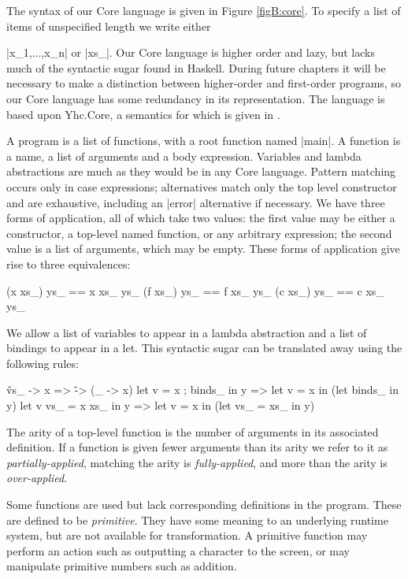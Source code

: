 The syntax of our Core language is given in Figure \ref{figB:core}. To specify a list of items of unspecified length we write either \ignore|x_1,...,x_n| or |xs_|. Our Core language is higher order and lazy, but lacks much of the syntactic sugar found in Haskell. During future chapters it will be necessary to make a distinction between higher-order and first-order programs, so our Core language has some redundancy in its representation. The language is based upon Yhc.Core, a semantics for which is given in \cite{me:yhc_core}.

A program is a list of functions, with a root function named |main|. A function is a name, a list of arguments and a body expression. Variables and lambda abstractions are much as they would be in any Core language.  Pattern matching occurs only in case expressions; alternatives match only the top level constructor and are exhaustive, including an |error| alternative if necessary. We have three forms of application, all of which take two values: the first value may be either a constructor, a top-level named function, or any arbitrary expression; the second value is a list of arguments, which may be empty. These forms of application give rise to three equivalences:

\ignore\begin{code}
(x xs_) ys_ == x xs_ ys_
(f xs_) ys_ == f xs_ ys_
(c xs_) ys_ == c xs_ ys_
\end{code}

We allow a list of variables to appear in a lambda abstraction and a list of bindings to appear in a let. This syntactic sugar can be translated away using the following rules:

\ignore\begin{code}
\v vs_ -> x              => \v -> (\vs_ -> x)
let v = x ; binds_ in y  => let v = x in (let binds_ in y)
let v vs_ = x xs_ in y   => let v = x in (let vs_ = xs_ in y)
\end{code}

The arity of a top-level function is the number of arguments in its associated definition. If a function is given fewer arguments than its arity we refer to it as \textit{partially-applied}, matching the arity is \textit{fully-applied}, and more than the arity is \textit{over-applied}.

Some functions are used but lack corresponding definitions in the program. These are defined to be \textit{primitive}. They have some meaning to an underlying runtime system, but are not available for transformation. A primitive function may perform an action such as outputting a character to the screen, or may manipulate primitive numbers such as addition.

